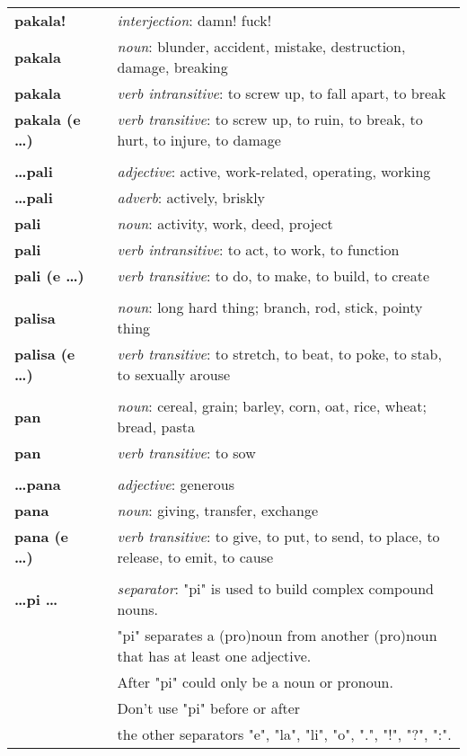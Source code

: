 \begin{supertabular}{p{2,5cm}|ll}
\textbf{pakala!} && \textit{interjection}: damn! fuck! \\ 
\textbf{pakala} && \textit{noun}: blunder, accident, mistake, destruction, damage, breaking \\ 
\textbf{pakala} && \textit{verb intransitive}: to screw up, to fall apart, to break \\ 
\textbf{pakala (e \dots)} && \textit{verb transitive}: to screw up, to ruin, to break, to hurt, to injure, to damage \\ 
 && \\ %
\textbf{\dots pali} && \textit{adjective}: active, work-related, operating, working \\ 
\textbf{\dots pali} && \textit{adverb}: actively, briskly \\ 
\textbf{pali} && \textit{noun}: activity, work, deed, project \\ 
\textbf{pali} && \textit{verb intransitive}: to act, to work, to function \\ 
\textbf{pali (e \dots)} && \textit{verb transitive}: to do, to make, to build, to create \\ 
 && \\ %
\textbf{palisa} && \textit{noun}: long hard thing; branch, rod, stick, pointy thing \\ 
\textbf{palisa (e \dots)} && \textit{verb transitive}: to stretch, to beat, to poke, to stab, to sexually arouse \\ 
 && \\ %
\textbf{pan} && \textit{noun}: cereal, grain; barley, corn, oat, rice, wheat; bread, pasta \\ 
\textbf{pan} && \textit{verb transitive}: to sow \\
 && \\ %
\textbf{\dots pana} && \textit{adjective}: generous \\ 
\textbf{pana} && \textit{noun}: giving, transfer, exchange \\ 
\textbf{pana (e \dots)} && \textit{verb transitive}: to give, to put, to send, to place, to release, to emit, to cause \\ 
 && \\ %
\textbf{\dots pi \dots } && \textit{separator}: "pi" is used to build complex compound nouns. \\ && "pi" separates a (pro)noun from another (pro)noun that has at least one adjective. \\ && After "pi" could only be a noun or pronoun. \\ && Don't use "pi" before or after \\ && the other separators "e", "la", "li", "o", ".", "!", "?", ":".  \\ 

\end{supertabular}
